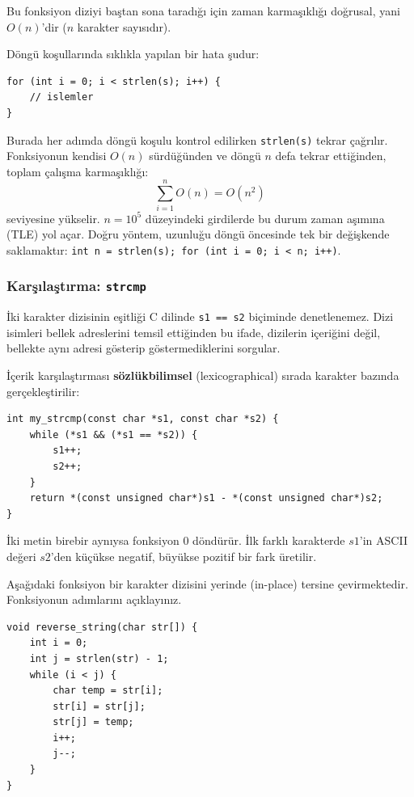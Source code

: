 Bu fonksiyon diziyi baştan sona taradığı için zaman karmaşıklığı doğrusal, yani $O(n)$'dir ($n$ karakter sayısıdır).

\begin{caution}
Döngü koşullarında sıklıkla yapılan bir hata şudur:
\begin{lstlisting}[language=CTemel]
for (int i = 0; i < strlen(s); i++) {
    // islemler
}
\end{lstlisting}
Burada her adımda döngü koşulu kontrol edilirken \texttt{strlen(s)} tekrar çağrılır. Fonksiyonun kendisi $O(n)$ sürdüğünden ve döngü $n$ defa tekrar ettiğinden, toplam çalışma karmaşıklığı:
\[
\sum_{i=1}^{n} O(n) = O(n^2)
\]
seviyesine yükselir. $n = 10^5$ düzeyindeki girdilerde bu durum zaman aşımına (TLE) yol açar. Doğru yöntem, uzunluğu döngü öncesinde tek bir değişkende saklamaktır: \texttt{int n = strlen(s); for (int i = 0; i < n; i++)}.
\end{caution}

\subsubsection{Karşılaştırma: \texttt{strcmp}}

İki karakter dizisinin eşitliği C dilinde \texttt{s1 == s2} biçiminde denetlenemez. Dizi isimleri bellek adreslerini temsil ettiğinden bu ifade, dizilerin içeriğini değil, bellekte aynı adresi gösterip göstermediklerini sorgular.

İçerik karşılaştırması \textbf{sözlükbilimsel} (lexicographical) sırada karakter bazında gerçekleştirilir:
\begin{lstlisting}[language=CTemel]
int my_strcmp(const char *s1, const char *s2) {
    while (*s1 && (*s1 == *s2)) {
        s1++;
        s2++;
    }
    return *(const unsigned char*)s1 - *(const unsigned char*)s2;
}
\end{lstlisting}
İki metin birebir aynıysa fonksiyon $0$ döndürür. İlk farklı karakterde $s1$'in ASCII değeri $s2$'den küçükse negatif, büyükse pozitif bir fark üretilir.

\begin{example}
Aşağıdaki fonksiyon bir karakter dizisini yerinde (in-place) tersine çevirmektedir. Fonksiyonun adımlarını açıklayınız.
\begin{lstlisting}[language=CTemel]
void reverse_string(char str[]) {
    int i = 0;
    int j = strlen(str) - 1;
    while (i < j) {
        char temp = str[i];
        str[i] = str[j];
        str[j] = temp;
        i++;
        j--;
    }
}
\end{lstlisting}
\end{example}

